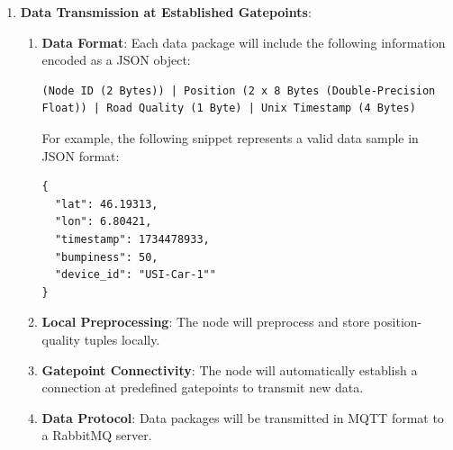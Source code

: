 \begin{enumerate}
    \item \textbf{Data Transmission at Established Gatepoints}: \\
        \begin{enumerate}
            \item \textbf{Data Format}: Each data package will include the following information encoded as a JSON object:
              \begin{lstlisting}[breaklines=true, basicstyle=\ttfamily]
(Node ID (2 Bytes)) | Position (2 x 8 Bytes (Double-Precision Float)) | Road Quality (1 Byte) | Unix Timestamp (4 Bytes)
              \end{lstlisting}

              For example, the following snippet represents a valid data sample in JSON format:

              \begin{lstlisting}[breaklines=true, basicstyle=\ttfamily]
{               
  "lat": 46.19313,
  "lon": 6.80421,
  "timestamp": 1734478933,
  "bumpiness": 50,
  "device_id": "USI-Car-1""
}
              \end{lstlisting}

            \item \textbf{Local Preprocessing}: The node will preprocess and store position-quality tuples locally.
            \item \textbf{Gatepoint Connectivity}: The node will automatically establish a connection at predefined gatepoints to transmit new data.
            \item \textbf{Data Protocol}: Data packages will be transmitted in MQTT format to a RabbitMQ server.
        \end{enumerate}
\end{enumerate}
